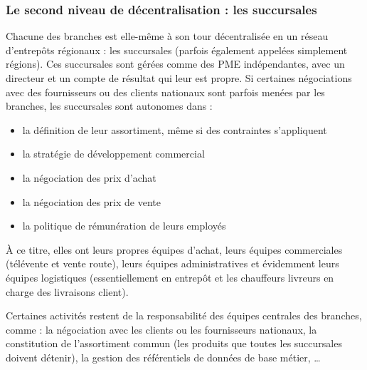             \subsubsection{Le second niveau de décentralisation : les succursales}
            \label{les_succursales}
            Chacune des branches est elle-même à son tour décentralisée en un réseau d'entrepôts régionaux : les succursales (parfois également appelées simplement \og régions\fg).
            Ces succursales sont gérées comme des PME indépendantes, avec un directeur et un compte de résultat qui leur est propre.
            Si certaines négociations avec des fournisseurs ou des clients nationaux sont parfois menées par les branches, les succursales sont autonomes dans :
            \begin{itemize}
                \item{la définition de leur assortiment, même si des contraintes s'appliquent}
                \item{la stratégie de développement commercial}
                \item{la négociation des prix d'achat}
                \item{la négociation des prix de vente}
                \item{la politique de rémunération de leurs employés}
            \end{itemize}
            
            \`{A} ce titre, elles ont leurs propres équipes d'achat, leurs équipes commerciales (télévente et vente route), leurs équipes administratives et évidemment leurs équipes logistiques (essentiellement en entrepôt et les chauffeurs livreurs en charge des livraisons client).

            Certaines activités restent de la responsabilité des équipes centrales des branches, comme : la négociation avec les clients ou les fournisseurs nationaux, la constitution de l'assortiment commun (les produits que toutes les succursales doivent détenir), la gestion des référentiels de données de base métier, \dots
            
